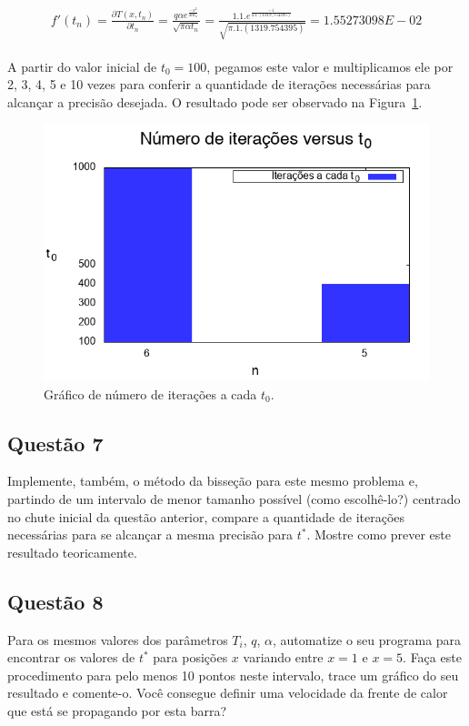 \documentclass[12pt]{article}
\begin{document}
\begin{eqnarray}
    \begin{split}
        f'(t_{n}) = \frac{\partial T(x, t_{n})}{\partial t_{n}} = \frac{q \alpha e^{\frac{-x^{2}}{4\alpha t_{n}}}}{\sqrt{\pi \alpha t_{n}}} = \frac{1.1.e^{\frac{-1}{4.1.(1319,754395)}}}{\sqrt{\pi.1.(1319.754395)}} = 1.55273098E-02
    \end{split}
    \label{eq:convnewr}
\end{eqnarray}

A partir do valor inicial de $t_{0} = 100$, pegamos este valor e multiplicamos ele por 2, 3, 4, 5 e 10 vezes para conferir a quantidade de iterações necessárias para alcançar a precisão desejada. O resultado pode ser observado na Figura~\ref{fig:p2q6g2}.

\begin{figure}[H]
	\centering
	\includegraphics[width=1\textwidth]{p2q6g2.png}
	\caption{Gráfico de número de iterações a cada $t_{0}$.}
	\label{fig:p2q6g2}
\end{figure}

\subsection*{Questão 7}
\label{sec:p2q7}
Implemente, também, o método da bisseção para este mesmo problema e, partindo de um intervalo de menor tamanho possível (como escolhê-lo?) centrado no chute inicial da questão anterior, compare a quantidade de iterações necessárias para se alcançar a mesma precisão para $t^{*}$. Mostre como prever este resultado teoricamente.

\subsection*{Questão 8}
\label{sec:p2q8}
Para os mesmos valores dos parâmetros $T_{i}$, $q$, $\alpha$, automatize o seu programa para encontrar os valores de $t^{*}$ para posições $x$ variando entre $x = 1$ e $x = 5$. Faça este procedimento para pelo menos 10 pontos neste intervalo, trace um gráfico do seu resultado e comente-o. Você consegue definir uma velocidade da frente de calor que está se propagando por esta barra?
\end{document}
